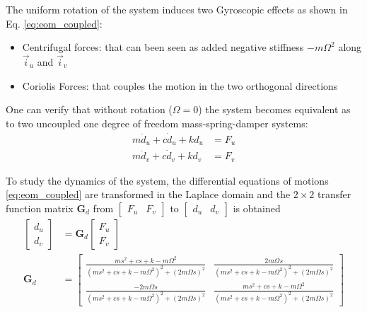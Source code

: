 \documentclass{ISMA_USD2020}
\begin{document}
The uniform rotation of the system induces two Gyroscopic effects as shown in Eq. \eqref{eq:eom_coupled}:
\begin{itemize}
\item Centrifugal forces: that can been seen as added negative stiffness \(- m \Omega^2\) along \(\vec{i}_u\) and \(\vec{i}_v\)
\item Coriolis Forces: that couples the motion in the two orthogonal directions
\end{itemize}

One can verify that without rotation (\(\Omega = 0\)) the system becomes equivalent as to two uncoupled one degree of freedom mass-spring-damper systems:
\begin{subequations}
\label{eq:oem_no_rotation}
  \begin{align}
    m \ddot{d}_u + c \dot{d}_u + k d_u &= F_u \\
    m \ddot{d}_v + c \dot{d}_v + k d_v &= F_v
  \end{align}
\end{subequations}

\par
To study the dynamics of the system, the differential equations of motions \eqref{eq:eom_coupled} are transformed in the Laplace domain and the \(2 \times 2\) transfer function matrix \(\bm{G}_d\) from \(\begin{bmatrix}F_u & F_v\end{bmatrix}\) to \(\begin{bmatrix}d_u & d_v\end{bmatrix}\) is obtained
\begin{align}
  \begin{bmatrix} d_u \\ d_v \end{bmatrix} &= \bm{G}_d \begin{bmatrix} F_u \\ F_v \end{bmatrix} \label{eq:Gd_mimo_tf} \\
  \bm{G}_{d} &=
  \begin{bmatrix}
    \frac{ms^2 + cs + k - m \Omega^2}{\left( m s^2 + cs + k - m \Omega^2 \right)^2 + \left( 2 m \Omega s \right)^2} & \frac{2 m \Omega s}{\left( m s^2 + cs + k - m \Omega^2 \right)^2 + \left( 2 m \Omega s \right)^2} \\
    \frac{-2 m \Omega s}{\left( m s^2 + cs + k - m \Omega^2 \right)^2 + \left( 2 m \Omega s \right)^2} & \frac{ms^2 + cs + k - m \Omega^2}{\left( m s^2 + cs + k - m \Omega^2 \right)^2 + \left( 2 m \Omega s \right)^2}
  \end{bmatrix} \label{eq:Gd_m_k_c}
\end{align}
\end{document}
